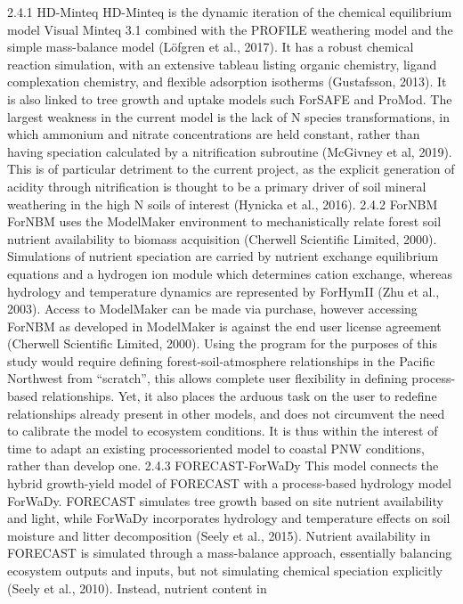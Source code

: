 \documentclass{article}
\begin{document}
2.4.1 HD-Minteq
HD-Minteq is the dynamic iteration of the chemical equilibrium model Visual Minteq 3.1
combined with the PROFILE weathering model and the simple mass-balance model (Löfgren et
al., 2017). It has a robust chemical reaction simulation, with an extensive tableau listing organic
chemistry, ligand complexation chemistry, and flexible adsorption isotherms (Gustafsson, 2013).
It is also linked to tree growth and uptake models such ForSAFE and ProMod. The largest
weakness in the current model is the lack of N species transformations, in which ammonium and
nitrate concentrations are held constant, rather than having speciation calculated by a nitrification
subroutine (McGivney et al, 2019). This is of particular detriment to the current project, as the
explicit generation of acidity through nitrification is thought to be a primary driver of soil
mineral weathering in the high N soils of interest (Hynicka et al., 2016).
2.4.2 ForNBM
ForNBM uses the ModelMaker environment to mechanistically relate forest soil nutrient
availability to biomass acquisition (Cherwell Scientific Limited, 2000). Simulations of nutrient
speciation are carried by nutrient exchange equilibrium equations and a hydrogen ion module
which determines cation exchange, whereas hydrology and temperature dynamics are
represented by ForHymII (Zhu et al., 2003).
Access to ModelMaker can be made via purchase, however accessing ForNBM as developed in
ModelMaker is against the end user license agreement (Cherwell Scientific Limited, 2000).
Using the program for the purposes of this study would require defining forest-soil-atmosphere
relationships in the Pacific Northwest from “scratch”, this allows complete user flexibility in
defining process-based relationships. Yet, it also places the arduous task on the user to redefine
relationships already present in other models, and does not circumvent the need to calibrate the
model to ecosystem conditions. It is thus within the interest of time to adapt an existing processoriented model to coastal PNW conditions, rather than develop one.
2.4.3 FORECAST-ForWaDy
This model connects the hybrid growth-yield model of FORECAST with a process-based
hydrology model ForWaDy. FORECAST simulates tree growth based on site nutrient
availability and light, while ForWaDy incorporates hydrology and temperature effects on soil
moisture and litter decomposition (Seely et al., 2015). Nutrient availability in FORECAST is
simulated through a mass-balance approach, essentially balancing ecosystem outputs and inputs,
but not simulating chemical speciation explicitly (Seely et al., 2010). Instead, nutrient content in
\end{document}
